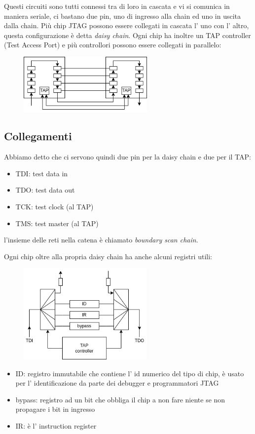 Questi circuiti sono tutti connessi tra di loro in cascata e vi si comunica in maniera seriale, ci bastano due pin, uno di ingresso alla chain ed uno in uscita dalla chain.
Più chip JTAG possono essere collegati in cascata l' uno con l' altro, questa configurazione è detta \emph{daisy chain}.
Ogni chip ha inoltre un TAP controller (Test Access Port) e più controllori possono essere collegati in parallelo:
\begin{figure}[H]
    \centering
    \includegraphics[width=250px]{images/26_JTAG/multiple_JTAG_chips.png}
\end{figure}

\subsection{Collegamenti}
Abbiamo detto che ci servono quindi due pin per la daisy chain e due per il TAP:
\begin{itemize}
    \item TDI: test data in
    \item TDO: test data out
    \item TCK: test clock (al TAP)
    \item TMS: test master (al TAP)
\end{itemize}
l'insieme delle reti nella catena è chiamato \emph{boundary scan chain}.

Ogni chip oltre alla propria daisy chain ha anche alcuni registri utili:
\begin{figure}[H]
    \centering
    \includegraphics[width=250px]{images/26_JTAG/tap_controller.png}
\end{figure}
\begin{itemize}
    \item ID: registro immutabile che contiene l' id numerico del tipo di chip, è usato per l' identificazione da parte dei debugger e programmatori JTAG
    
    \item bypass: registro ad un bit che obbliga il chip a non fare niente se non propagare i bit in ingresso
    
    \item IR: è l' instruction register
\end{itemize}

